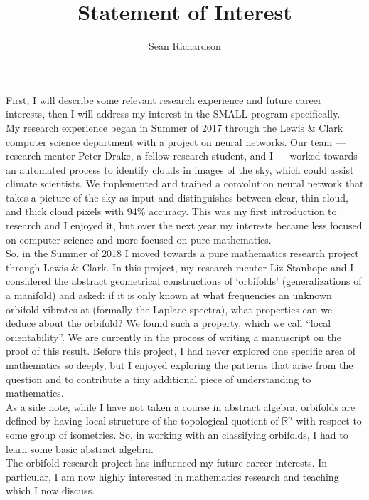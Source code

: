 \documentclass[12pt]{amsart}
\begin{document}
\title{Statement of Interest}
\author{Sean Richardson}
\maketitle

First, I will describe some relevant research experience and future career
interests, then I will address my interest in the SMALL program
specifically.\\

My research experience began in Summer of 2017 through the Lewis \& Clark
computer science department with a project on neural networks. Our team ---
research mentor Peter Drake, a fellow research student, and I --- worked
towards an automated process to identify clouds in images of the sky, which
could assist climate scientists. We implemented and trained a convolution
neural network that takes a picture of the sky as input and distinguishes
between clear, thin cloud, and thick cloud pixels with 94\% accuracy. This
was my first introduction to research and I enjoyed it, but over the next
year my interests became less focused on computer science and more focused
on pure mathematics.\\

So, in the Summer of 2018 I moved towards a pure mathematics research
project through Lewis \& Clark. In this project, my research mentor Liz
Stanhope and I considered the abstract geometrical constructions of
‘orbifolds’ (generalizations of a manifold) and asked: if it is only known
at what frequencies an unknown orbifold vibrates at (formally the Laplace
spectra), what properties can we deduce about the orbifold? We found such a
property, which we call “local orientability”. We are currently in the
process of writing a manuscript on the proof of this result. Before this
project, I had never explored one specific area of mathematics so deeply,
but I enjoyed exploring the patterns that arise from the question and to
contribute a tiny additional piece of understanding to mathematics.\\

As a side note, while I have not taken a course in abstract algebra,
orbifolds are defined by having local structure of the topological quotient
of $\mathbb{R}^n$ with respect to some group of isometries. So, in working
with an classifying orbifolds, I had to learn some basic abstract
algebra.\\

The orbifold research project has influenced my future career interests. In
particular, I am now highly interested in mathematics research and teaching
which I now discuss.\\
\end{document}
